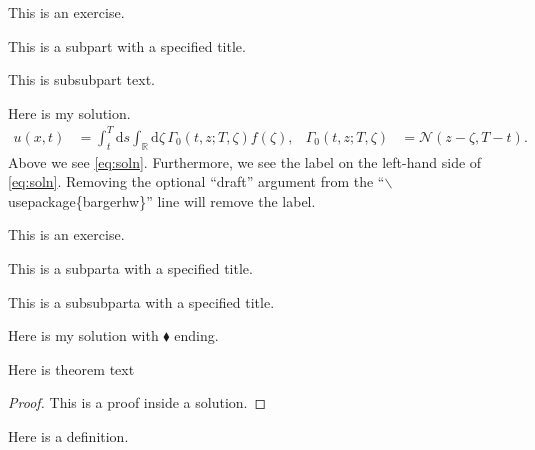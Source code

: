 \documentclass[11pt]{article}
\begin{document}
\begin{exercise}
This is an exercise.

	\begin{subpart}
	This is a subpart with a specified title.
		\begin{subsubpart}
		This is subsubpart text.
		\end{subsubpart}
	\end{subpart}

\end{exercise}

\begin{solution}
Here is my solution.
\begin{align}
u(x,t)
	&= \int_t^T \mathrm{d} s \int_{\mathds{R}} \mathrm{d} \zeta\, \Gamma_0\left( t, z; T, \zeta \right) f(\zeta), &
\Gamma_0(t,z;T,\zeta)
	&= \mathcal{N}(z - \zeta, T-t). \label{eq:soln}
\end{align}
Above we see \eqref{eq:soln}. Furthermore, we see the label on the left-hand side of \eqref{eq:soln}. Removing the optional ``draft'' argument from the ``$\backslash$usepackage\{bargerhw\}'' line will remove the label. 
\end{solution}



\begin{exercise}
This is an exercise.

	\begin{subparta}
	This is a subparta with a specified title.
		\begin{subsubparta}
		This is a subsubparta with a specified title.
		\end{subsubparta}
	\end{subparta}

\end{exercise}

\begin{solution}[$\blacklozenge$]
Here is my solution with $\blacklozenge$ ending.

\begin{theorem}
Here is theorem text
\end{theorem}
\begin{proof}
	This is a proof inside a solution.
\end{proof}


\begin{definition}
Here is a definition.
\end{definition}
\end{solution}
\end{document}
